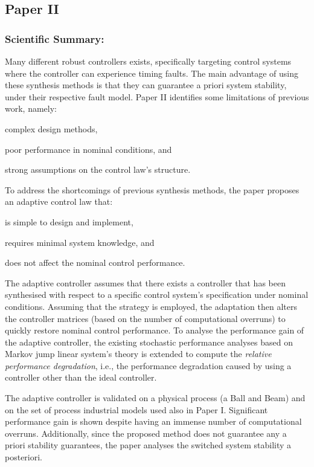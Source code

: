\subsection*{Paper II}%
%
\begin{quote}
\end{quote}

\subsubsection*{Scientific Summary:}%
%
Many different robust controllers exists, specifically targeting control systems where the controller can experience timing faults.
The main advantage of using these synthesis methods is that they can guarantee a priori system stability, under their respective fault model.
Paper II identifies some limitations of previous work, namely:
\begin{enumerate*}[label=(\roman*)]
    \item complex design methods,
    \item poor performance in nominal conditions, and
    \item strong assumptions on the control law's structure.
\end{enumerate*}

To address the shortcomings of previous synthesis methods, the paper proposes an adaptive control law that:
\begin{enumerate*}[label=(\roman*)]
    \item is simple to design and implement,
    \item requires minimal system knowledge, and
    \item does not affect the nominal control performance.
\end{enumerate*}
The adaptive controller assumes that there exists a controller that has been synthesised with respect to a specific control system's specification under nominal conditions.
Assuming that the \tK{} strategy is employed, the adaptation then alters the controller matrices (based on the number of computational overruns) to quickly restore nominal control performance.
To analyse the performance gain of the adaptive controller, the existing stochastic performance analyses based on Markov jump linear system's theory is extended to compute the \emph{relative performance degradation}, i.e., the performance degradation caused by using a controller other than the ideal controller.

The adaptive controller is validated on a physical process (a Ball and Beam) and on the set of process industrial models used also in Paper I.
Significant performance gain is shown despite having an immense number of computational overruns.
Additionally, since the proposed method does not guarantee any a priori stability guarantees, the paper analyses the switched system stability a posteriori.

